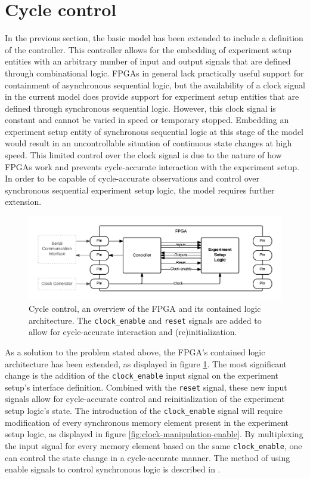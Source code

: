 \documentclass[openright]{uva-bachelor-thesis}
\begin{document}



\section{Cycle control}
\label{sectioncyclecontrol}
In the previous section, the basic model has been extended to include a definition of the controller. This controller allows for the embedding of experiment setup entities with an arbitrary number of input and output signals that are defined through combinational logic. FPGAs in general lack practically useful support for containment of asynchronous sequential logic, but the availability of a clock signal in the current model does provide support for experiment setup entities that are defined through synchronous sequential logic. However, this clock signal is constant and cannot be varied in speed or temporary stopped. Embedding an experiment setup entity of synchronous sequential logic at this stage of the model would result in an uncontrollable situation of continuous state changes at high speed. This limited control over the clock signal is due to the nature of how FPGAs work and prevents cycle-accurate interaction with the experiment setup. In order to be capable of cycle-accurate observations and control over synchronous sequential experiment setup logic, the model requires further extension.

\begin{figure}[h]
\centering
\includegraphics[width=\textwidth]{fpga-control}
\caption{Cycle control, an overview of the FPGA and its contained logic architecture. The \texttt{clock\_enable} and \texttt{reset} signals are added to allow for cycle-accurate interaction and (re)initialization.}
\label{fig:fpga-control}
\end{figure}

As a solution to the problem stated above, the FPGA's contained logic architecture has been extended, as displayed in figure \ref{fig:fpga-control}. The most significant change is the addition of the \texttt{clock\_enable} input signal on the experiment setup's interface definition. Combined with the \texttt{reset} signal, these new input signals allow for cycle-accurate control and reinitialization of the experiment setup logic's state. The introduction of the \texttt{clock\_enable} signal will require modification of every synchronous memory element present in the experiment setup logic, as displayed in figure \ref{fig:clock-manipulation-enable}. By multiplexing the input signal for every memory element based on the same \texttt{clock\_enable}, one can control the state change in a cycle-accurate manner. The method of using enable signals to control synchronous logic is described in \cite[Sec 2.4.5]{arora2011art}.
\end{document}
